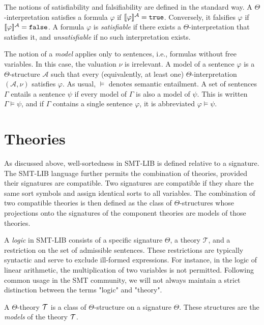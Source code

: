 The notions of satisfiability and falsifiability are defined in the standard way.
A $\Theta$-interpretation satisfies a formula $\varphi$ if $\llbracket \varphi \rrbracket^{\mathcal{A}} = \kw{true}$.
Conversely, it falsifies $\varphi$ if $\llbracket \varphi \rrbracket^{\mathcal{A}} = \kw{false}$.
A formula $\varphi$ is \emph{satisfiable} if there exists a $\Theta$-interpretation that satisfies it, and \emph{unsatisfiable} if no such interpretation exists.

The notion of a \emph{model} applies only to sentences, i.e., formulas without free variables.
In this case, the valuation $\nu$ is irrelevant.
A model of a sentence $\varphi$ is a $\Theta$-structure $\mathcal{A}$ such that every (equivalently, at least one) $\Theta$-interpretation $(\mathcal{A}, \nu)$ satisfies $\varphi$.
As usual, $\models$ denotes semantic entailment. A set of sentences $\Gamma$ entails a sentence $\psi$ if every model of $\Gamma$ is also a model of $\psi$.
This is written $\Gamma \models \psi$, and if $\Gamma$ contains a single sentence $\varphi$, it is abbreviated $\varphi \models \psi$.

\section{Theories}

As discussed above, well-sortedness in SMT-LIB is defined relative to a signature.
The SMT-LIB language further permits the combination of theories, provided their signatures are compatible.
Two signatures are compatible if they share the same sort symbols and assign identical sorts to all variables.
The combination of two compatible theories is then defined as the class of $\Theta$-structures whose projections onto the signatures of the component theories are models of those theories.

A \emph{logic} in SMT-LIB consists of a specific signature $\Theta$, a theory $\mathcal{T}$, and a restriction on the set of admissible sentences.
These restrictions are typically syntactic and serve to exclude ill-formed expressions.
For instance, in the logic of linear arithmetic, the multiplication of two variables is not permitted.
Following common usage in the SMT community, we will not always maintain a strict distinction between the terms "logic" and "theory".

\begin{definition}[Models]
A $\Theta$-theory $\cal{T}$ is a class of $\Theta$-structure on a signature $\Theta$.
These structures are the \emph{models} of the theory $\cal{T}$.
\end{definition}

